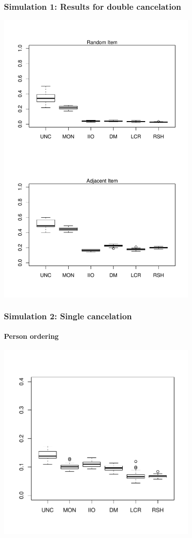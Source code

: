 \documentclass[10pt,serif,professionalfont]{beamer}
\begin{document}
\begin{frame}
    \frametitle{Simulation 1: Results for double cancelation}

    \centering \includegraphics[width=0.75\textwidth, clip, trim = 0 0 0 4.5in]{./figs/boxplots.pdf}

\end{frame}


\begin{frame}
    \frametitle{Simulation 2: Single cancelation}
        \framesubtitle{Person ordering}

    \centering \includegraphics[width=0.75\textwidth]{./figs/violations_columns_weighted.pdf}

\end{frame}
\end{document}
